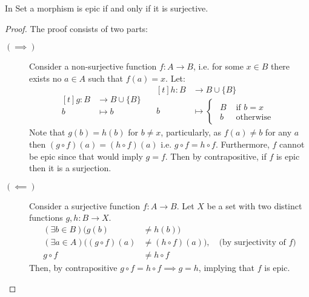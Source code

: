 \begin{theorem}\label{thm:epi_iff_sur}
  In Set a morphism is epic if and only if it is surjective.

  \begin{proof}
    The proof consists of two parts:
    \begin{description}
      \item[$(\implies)$] Consider a non-surjective function $f:A\to B$, i.e.
        for some $x\in B$ there exists no $a\in A$ such that $f(a) = x$. Let:
        \[
          \begin{aligned}[t]
            g:B &\to B \cup \{B\}\\
            b &\mapsto b
          \end{aligned}
          \quad
          \begin{aligned}[t]
            h:B &\to B \cup \{B\}\\
            b &\mapsto
            \begin{cases}
              \begin{aligned}
                B &\text{ if } b = x\\
                b &\text{ otherwise}
              \end{aligned}
            \end{cases}
          \end{aligned}
        \]
        Note that $g(b) = h(b)$ for $b\neq x$, particularly, as $f(a)\neq b$ for
        any $a$ then $(g\circ f)(a) = (h\circ f)(a)$ i.e. $g\circ f = h\circ f$.
        Furthermore, $f$ cannot be epic since that would imply $g=f$. Then by
        contrapositive, if $f$ is epic then it is a surjection.
      \item[$(\impliedby)$] Consider a surjective function $f:A\to B$. Let $X$
        be a set with two distinct functions $g, h: B \to X$.
        \[
          \begin{aligned}
            (\exists b\in B)(g(b) &\neq h(b))\\
            (\exists a\in A)((g\circ f)(a) &\neq (h\circ f)(a))
            ,\quad\text{(by surjectivity of $f$)}\\
            g\circ f &\neq h\circ f
          \end{aligned}
        \]
        Then, by contrapositive $g\circ f = h\circ f \implies g=h$, implying
        that $f$ is epic.
    \end{description}
  \end{proof}
\end{theorem}


